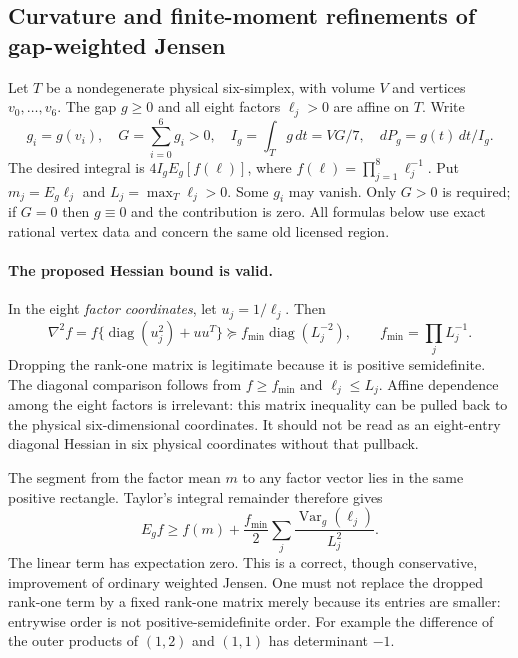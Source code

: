 \subsection{Curvature and finite-moment refinements of gap-weighted Jensen}
\label{sec:sixth-jensen-curvature-independent}

Let $T$ be a nondegenerate physical six-simplex, with volume $V$ and
vertices $v_0,\ldots,v_6$. The gap $g\ge0$ and all eight factors
$\ell_j>0$ are affine on $T$. Write
\[
 g_i=g(v_i),\quad G=\sum_{i=0}^6g_i>0,\quad
 I_g=\int_Tg\,dt=VG/7,
 \quad dP_g=g(t)\,dt/I_g.
\]
The desired integral is $4I_g E_g[f(\ell)]$, where
$f(\ell)=\prod_{j=1}^8\ell_j^{-1}$.
Put $m_j=E_g\ell_j$ and $L_j=\max_T\ell_j>0$.
Some $g_i$ may vanish. Only $G>0$ is required; if $G=0$ then
$g\equiv0$ and the contribution is zero. All formulas below use exact
rational vertex data and concern the same old licensed region.

\paragraph{The proposed Hessian bound is valid.}
In the eight \emph{factor coordinates}, let $u_j=1/\ell_j$. Then
\[
 \nabla^2 f=f\{\operatorname{diag}(u_j^2)+uu^T\}
 \succeq f_{\min}\operatorname{diag}(L_j^{-2}),
 \qquad f_{\min}=\prod_jL_j^{-1}.
\]
Dropping the rank-one matrix is legitimate because it is positive
semidefinite. The diagonal comparison follows from $f\ge f_{\min}$
and $\ell_j\le L_j$. Affine dependence among the eight factors is
irrelevant: this matrix inequality can be pulled back to the physical
six-dimensional coordinates. It should not be read as an eight-entry
diagonal Hessian in six physical coordinates without that pullback.

The segment from the factor mean $m$ to any factor vector lies in
the same positive rectangle. Taylor's integral remainder therefore gives
\[
 E_g f\ge f(m)+\frac{f_{\min}}2
                   \sum_j\frac{\operatorname{Var}_g(\ell_j)}{L_j^2}.
\]
The linear term has expectation zero. This is a correct, though
conservative, improvement of ordinary weighted Jensen.
One must not replace the dropped rank-one term by a fixed rank-one
matrix merely because its entries are smaller: entrywise order is not
positive-semidefinite order. For example the difference of the outer
products of $(1,2)$ and $(1,1)$ has determinant $-1$.

